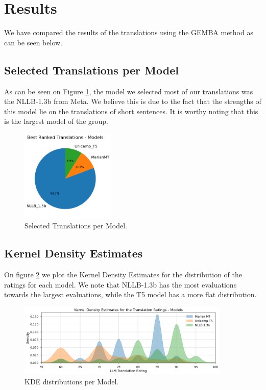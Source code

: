 \documentclass{article}
\begin{document}
\section{Results}

We have compared the results of the translations using the GEMBA method as can be seen below.

\subsection{Selected Translations per Model}

As can be seen on Figure \ref{fig:pie}, the model we selected most of our
translations was the NLLB-1.3b from Meta. We believe this is due to the fact
that the strengths of this model lie on the translations of short sentences. It
is worthy noting that this is the largest model of the group.

\begin{figure}[htbp]
    \centering
    \includegraphics[width=0.4\textwidth]{figures/pie-chart.png}
    \caption{\label{fig:pie}Selected Translations per Model.}
\end{figure}
\FloatBarrier

\subsection{Kernel Density Estimates}

On figure \ref{fig:kde} we plot the Kernel Density Estimates for the
distribution of the ratings for each model. We note that NLLB-1.3b has the most
evaluations towards the largest evaluations, while the T5 model has a more flat
distribution.

\begin{figure}[htbp]
    \centering
    \includegraphics[width=0.9\textwidth]{figures/kde.png}
    \caption{\label{fig:kde}KDE distributions per Model.}
\end{figure}
\FloatBarrier
\end{document}
